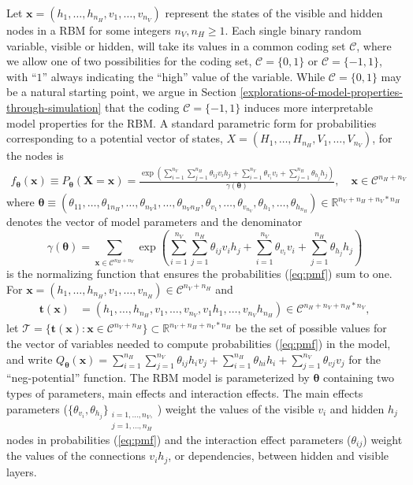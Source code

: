 \documentclass[12pt]{article}
\theoremstyle{definition}
\newcommand{\nv}{{n_{\scriptscriptstyle V}}}
\newcommand{\nh}{{n_{\scriptscriptstyle H}}}
\begin{document}
Let \(\boldsymbol x = (h_1, \dots, h_\nh, v_1,\dots,v_\nv)\) represent
the states of the visible and hidden nodes in a RBM for some integers
\(\nv, \nh \ge 1\). Each single binary random variable, visible or
hidden, will take its values in a common coding set \(\mathcal{C}\),
where we allow one of two possibilities for the coding set,
\(\mathcal{C}=\{0,1\}\) or \(\mathcal{C}=\{-1,1\}\), with ``\(1\)''
always indicating the ``high'' value of the variable. While
\(\mathcal{C}=\{0,1\}\) may be a natural starting point, we argue in
Section \ref{explorations-of-model-properties-through-simulation} that
the coding \(\mathcal{C}=\{-1,1\}\) induces more interpretable model
properties for the RBM. A standard parametric form for probabilities
corresponding to a potential vector of states,
\(X = (H_1, \dots, H_\nh, V_1,\dots,V_\nv)\), for the nodes is
\begin{align}
\label{eq:pmf}
f_{\boldsymbol \theta} (\boldsymbol x)\equiv P_{\boldsymbol \theta}(\boldsymbol X = \boldsymbol x) = \frac{\exp\left(\sum\limits_{i = 1}^\nv \sum\limits_{j=1}^\nh \theta_{ij} v_i h_j + \sum\limits_{i = 1}^\nv\theta_{v_i} v_i + \sum\limits_{j = 1}^\nh\theta_{h_j} h_j\right)}{\gamma(\boldsymbol \theta)}, \quad \boldsymbol x \in \mathcal{C}^{\nh + \nv} 
\end{align}
where
\(\boldsymbol \theta \equiv (\theta_{11}, \dots, \theta_{1\nh}, \dots, \theta_{\nv 1}, \dots, \theta_{\nv \nh}, \theta_{v_1}, \dots, \theta_{v_\nv}, \theta_{h_1}, \dots, \theta_{h_\nh}) \in \mathbb{R}^{\nv + \nh + \nv*\nh}\)
denotes the vector of model parameters and the denominator \[
\gamma(\boldsymbol \theta) = \sum_{\boldsymbol x \in \mathcal{C}^{\nh+\nv}}\exp\left(\sum_{i = 1}^\nv \sum_{j=1}^\nh \theta_{ij} v_i h_j + \sum_{i = 1}^\nv\theta_{v_i} v_i + \sum_{j = 1}^\nh\theta_{h_j} h_j\right)
\] is the normalizing function that ensures the probabilities
(\eqref{eq:pmf}) sum to one. For
\(\boldsymbol x = (h_1, \dots, h_\nh, v_1, \dots, v_\nh) \in \mathcal{C}^{\nv + \nh}\)
and
\begin{align}
\boldsymbol t(\boldsymbol x) &= (h_1, \dots, h_\nh, v_1, \dots, v_\nv, v_1 h_1, \dots, v_\nv h_\nh) \in \mathcal{C}^{\nh + \nv + \nh*\nv}, \label{eq:t}
\end{align}
let
\(\mathcal{T} = \{\boldsymbol t(\boldsymbol x): \boldsymbol x \in \mathcal{C}^{\nv + \nh}\} \subset \mathbb{R}^{\nv + \nh + \nv * \nh}\)
be the set of possible values for the vector of variables needed to
compute probabilities (\eqref{eq:pmf}) in the model, and write
\(Q_{\boldsymbol \theta}(\boldsymbol x) = \sum\limits_{i = 1}^\nh\sum\limits_{j=1}^\nv \theta_{ij} h_i v_j + \sum\limits_{i = 1}^\nh\theta_{hi} h_i + \sum\limits_{j = 1}^\nv\theta_{vj} v_j\)
for the ``neg-potential'' function. The RBM model is parameterized by
\(\boldsymbol \theta\) containing two types of parameters, main effects
and interaction effects. The main effects parameters
(\(\{\theta_{v_i}, \theta_{h_j}\}_{\substack{i = 1, \dots, \nv,\\j = 1, \dots, \nh}}\))
weight the values of the visible \(v_i\) and hidden \(h_j\) nodes in
probabilities (\eqref{eq:pmf}) and the interaction effect parameters
(\(\theta_{ij}\)) weight the values of the connections \(v_i h_j\), or
dependencies, between hidden and visible layers.
\end{document}
